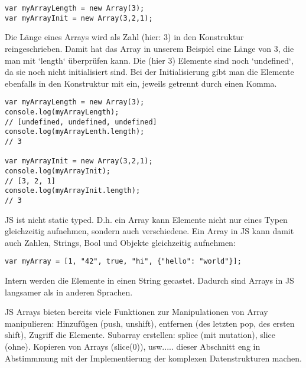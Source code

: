 \documentclass{book}
\begin{document}
\begin{lstlisting}[caption=Array Konstruktor]
var myArrayLength = new Array(3);
var myArrayInit = new Array(3,2,1);
\end{lstlisting}

Die Länge eines Arrays wird als Zahl (hier: 3) in den Konstruktur reingeschrieben. Damit hat das Array in unserem Beispiel eine Länge von 3, die man mit `length` überprüfen kann. Die (hier 3) Elemente sind noch `undefined`, da sie noch nicht initialisiert sind. Bei der Initialisierung gibt man die Elemente ebenfalls in den Konstruktur mit ein, jeweils getrennt durch einen Komma. 
\begin{lstlisting}[caption=Array Konstruktor]
var myArrayLength = new Array(3);
console.log(myArrayLength); 
// [undefined, undefined, undefined]
console.log(myArrayLenth.length); 
// 3

var myArrayInit = new Array(3,2,1);
console.log(myArrayInit); 
// [3, 2, 1]
console.log(myArrayInit.length); 
// 3
\end{lstlisting}

JS ist nicht static typed. D.h. ein Array kann Elemente nicht nur eines Typen gleichzeitig aufnehmen, sondern auch verschiedene. Ein Array in JS kann damit auch Zahlen, Strings, Bool und Objekte gleichzeitig aufnehmen:

\begin{lstlisting}[caption=Array Konstruktor]
var myArray = [1, "42", true, "hi", {"hello": "world"}];
\end{lstlisting}

Intern werden die Elemente in einen String gecastet. Dadurch sind Arrays in JS langsamer als in anderen Sprachen. 

JS Arrays bieten bereits viele Funktionen zur Manipulationen von 
Array manipulieren: Hinzufügen (push, unshift), entfernen (des letzten pop, des ersten shift), Zugriff die Elemente. Subarray erstellen: splice (mit mutation), slice (ohne). Kopieren von Arrays (slice(0)), usw..... dieser Abschnitt eng in Abstimmmung mit der Implementierung der komplexen Datenstrukturen machen.
\end{document}
